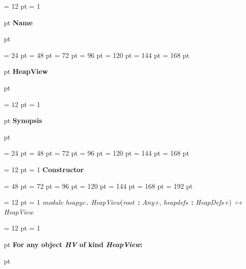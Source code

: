 {\par \noindent
{\par \pagebreak[3.300000] \noindent \hangindent = 12 pt \hangafter = 1 
{\par \pagebreak[3]  pt \noindent
{\Large {\bf Name\/}}\par {} pt
} \noindent
\par}
{\par \noindent  \leftskip = 24 pt  \leftmargini = 48 pt  \leftmarginii = 72 pt  \leftmarginiii = 96 pt  \leftmarginiv = 120 pt  \leftmarginv = 144 pt  \leftmarginvi = 168 pt {\par \pagebreak[3]  pt \noindent
{\Large {\bf HeapView\/}}\par {} pt
} \noindent
\par}
{\par \pagebreak[3.300000] \noindent \hangindent = 12 pt \hangafter = 1 
{\par \pagebreak[3]  pt \noindent
{\Large {\bf Synopsis\/}}\par {} pt
} \noindent
\par}
{\par \noindent  \leftskip = 24 pt  \leftmargini = 48 pt  \leftmarginii = 72 pt  \leftmarginiii = 96 pt  \leftmarginiv = 120 pt  \leftmarginv = 144 pt  \leftmarginvi = 168 pt {\par \noindent
{\par \pagebreak[3.200000] \noindent \hangindent = 12 pt \hangafter = 1 
{\large {\bf Constructor\/}}\par}
{\par \noindent  \leftskip = 48 pt  \leftmargini = 72 pt  \leftmarginii = 96 pt  \leftmarginiii = 120 pt  \leftmarginiv = 144 pt  \leftmarginv = 168 pt  \leftmarginvi = 192 pt {\par \noindent
{\par \pagebreak[3.100000] \noindent \hangindent = 12 pt \hangafter = 1 
 {\em module heapyc\/}{\large {\tt .\/} {\em HeapView\/}}({\em root\/}~{\bf :}  {\em Any+\/}, {\em heapdefs\/}~{\bf :}  {\em HeapDefs+\/}) \(\mapsto \)  {\em HeapView\/}\par}
\par}
\par}
{\par \pagebreak[3.200000] \noindent \hangindent = 12 pt \hangafter = 1 
{\par \pagebreak[2]  pt \noindent
{\large {\bf For any object {\em HV\/} of kind  {\em HeapView\/}:\/}}\par {} pt
}}}}}
